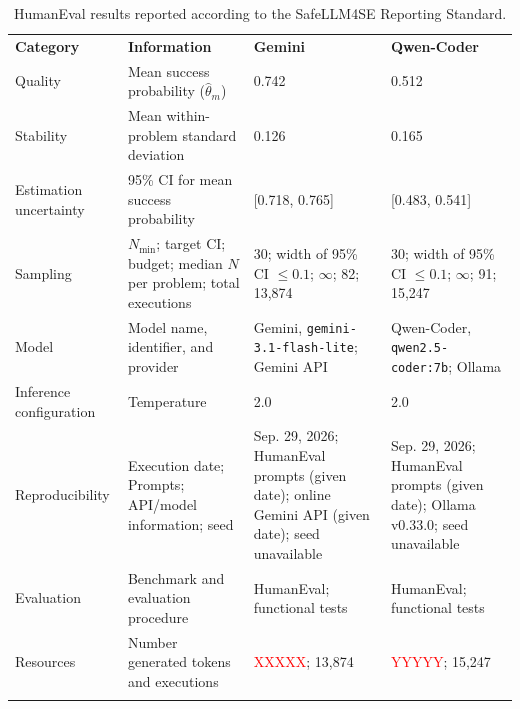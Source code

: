 \documentclass{IEEEcsmag}
\begin{document}
\begin{table}%
	\vspace*{4pt}
	\caption{HumanEval results reported according to the SafeLLM4SE Reporting Standard.}
	\label{table:case-study-reporting}
	\begin{tabular*}{\linewidth}{@{\extracolsep\fill} p{2.0cm} p{5.2cm} p{4.1cm} p{4.1cm}}
		\toprule
		\textbf{Category} & \textbf{Information} &
		\textbf{Gemini} & \textbf{Qwen-Coder} \\
		\colrule
		Quality &
		Mean success probability ($\hat{\theta}_{m}$) &
		0.742 & 0.512 \\
		
		Stability &
		Mean within-problem standard deviation &
		0.126 & 0.165 \\
		
		Estimation uncertainty &
		95\% CI for mean success probability &
		[0.718, 0.765] & [0.483, 0.541] \\
		
		Sampling &
		$N_{\min}$; target CI; budget; median $N$ per problem; total executions &
		30; width of 95\% CI $\leq 0.1$; $\infty$; 82; 13,874 &
		30; width of 95\% CI $\leq 0.1$; $\infty$; 91; 15,247 \\
		
		Model &
		Model name, identifier, and provider &
		Gemini, \texttt{gemini-\discretionary{}{}{}3.1-\discretionary{}{}{}flash-\discretionary{}{}{}lite}; Gemini API &
		Qwen-Coder, \texttt{qwen2.5-\discretionary{}{}{}co\-der\-:\-7b}; Ollama \\
		
		Inference configuration &
		Temperature &
		2.0 & 2.0 \\
		
		Reproducibility &
		Execution date; Prompts; API/model information; seed &
		Sep. 29, 2026; HumanEval prompts (given date); online Gemini API (given date); seed unavailable &
		Sep. 29, 2026; HumanEval prompts (given date); Ollama v0.33.0; seed unavailable \\
		
		Evaluation &
		Benchmark and evaluation procedure &
		HumanEval; functional tests &
		HumanEval; functional tests \\
		
		Resources &
		Number generated tokens and executions &
		\textcolor{red}{XXXXX}; 13,874 &
		\textcolor{red}{YYYYY}; 15,247 \\
		\botrule
	\end{tabular*}
	\vspace*{8pt}
	
\end{table}
\end{document}
